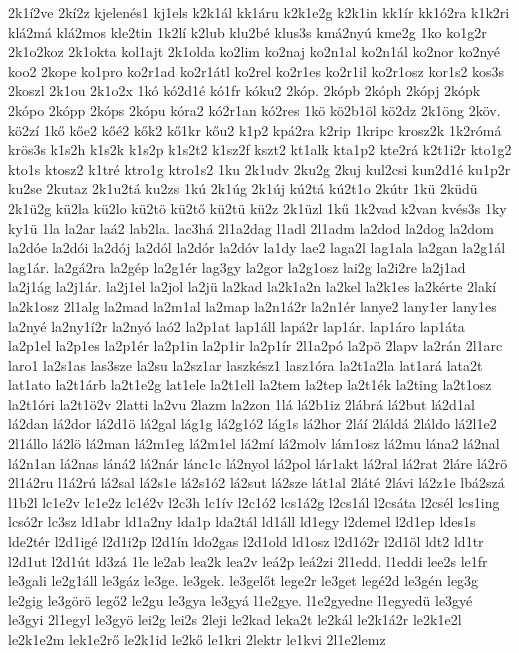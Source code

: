 {2k1í2ve
2kí2z
kjelenés1
kj1els
k2k1ál
kk1áru
k2k1e2g
k2k1in
kk1ír
kk1ó2ra
k1k2ri
klá2má
klá2mos
kle2tin
1k2lí
k2lub
klu2bé
klus3s
kmá2nyú
kme2g
1ko
ko1g2r
2k1o2koz
2k1okta
kol1ajt
2k1olda
ko2lim
ko2naj
ko2n1al
ko2n1ál
ko2nor
ko2nyé
koo2
2kope
ko1pro
ko2r1ad
ko2r1átl
ko2rel
ko2r1es
ko2r1il
ko2r1osz
kor1s2
kos3s
2koszl
2k1ou
2k1o2x
1kó
kó2d1é
kó1fr
kóku2
2kóp.
2kópb
2kóph
2kópj
2kópk
2kópo
2kópp
2kóps
2kópu
kóra2
kó2r1an
kó2res
1kö
kö2b1öl
kö2dz
2k1öng
2köv.
kö2zí
1kő
kőe2
kőé2
kők2
kő1kr
kőu2
k1p2
kpá2ra
k2rip
1kripc
krosz2k
1k2rómá
krös3s
k1s2h
k1s2k
k1s2p
k1s2t2
k1sz2f
kszt2
kt1alk
kta1p2
kte2rá
k2t1i2r
kto1g2
kto1s
ktosz2
k1tré
ktro1g
ktro1s2
1ku
2k1udv
2ku2g
2kuj
kul2csi
kun2d1é
ku1p2r
ku2se
2kutaz
2k1u2tá
ku2zs
1kú
2k1úg
2k1új
kú2tá
kú2t1o
2kútr
1kü
2küdü
2k1ü2g
kü2la
kü2lo
kü2tö
kü2tő
kü2tü
kü2z
2k1üzl
1kű
1k2vad
k2van
kvés3s
1ky
ky1ü
1la
la2ar
laá2
lab2la.
lac3há
2l1a2dag
l1adl
2l1adm
la2dod
la2dog
la2dom
la2dóe
la2dói
la2dój
la2dól
la2dór
la2dóv
la1dy
lae2
laga2l
lag1ala
la2gan
la2g1ál
lag1ár.
la2gá2ra
la2gép
la2g1ér
lag3gy
la2gor
la2g1osz
lai2g
la2i2re
la2j1ad
la2j1ág
la2j1ár.
la2j1el
la2jol
la2jü
la2kad
la2k1a2n
la2kel
la2k1es
la2kérte
2lakí
la2k1osz
2l1alg
la2mad
la2m1al
la2map
la2n1á2r
la2n1ér
lanye2
lany1er
lany1es
la2nyé
la2ny1í2r
la2nyó
laó2
la2p1at
lap1áll
lapá2r
lap1ár.
lap1áro
lap1áta
la2p1el
la2p1es
la2p1ér
la2p1in
la2p1ir
la2p1ír
2l1a2pó
la2pö
2lapv
la2rán
2l1arc
laro1
la2s1as
las3sze
la2su
la2sz1ar
laszkész1
lasz1óra
la2t1a2la
lat1ará
lata2t
lat1ato
la2t1árb
la2t1e2g
lat1ele
la2t1ell
la2tem
la2tep
la2t1ék
la2ting
la2t1osz
la2t1óri
la2t1ö2v
2latti
la2vu
2lazm
la2zon
1lá
lá2b1iz
2lábrá
lá2but
lá2d1al
lá2dan
lá2dor
lá2d1ö
lá2gal
lág1g
lá2g1ó2
lág1s
lá2hor
2láí
2láldá
2láldo
lá2l1e2
2l1állo
lá2lö
lá2man
lá2m1eg
lá2m1el
lá2mí
lá2molv
lám1osz
lá2mu
lána2
lá2nal
lá2n1an
lá2nas
láná2
lá2nár
lánc1c
lá2nyol
lá2pol
lár1akt
lá2ral
lá2rat
2láre
lá2rö
2l1á2ru
l1á2rú
lá2sal
lá2s1e
lá2s1ó2
lá2sut
lá2sze
lát1al
2láté
2lávi
lá2z1e
lbá2szá
l1b2l
lc1e2v
lc1e2z
lc1é2v
l2c3h
lc1ív
l2c1ó2
lcs1á2g
l2cs1ál
l2csáta
l2csél
lcs1ing
lcsó2r
lc3sz
ld1abr
ld1a2ny
lda1p
lda2tál
ld1áll
ld1egy
l2demel
l2d1ep
ldes1s
lde2tér
l2d1igé
l2d1i2p
l2d1ín
ldo2gas
l2d1old
ld1osz
l2d1ó2r
l2d1öl
ldt2
ld1tr
l2d1ut
l2d1út
ld3zá
1le
le2ab
lea2k
lea2v
leá2p
leá2zi
2l1edd.
l1eddi
lee2s
le1fr
le3gali
le2g1áll
le3gáz
le3ge.
le3gek.
le3gelőt
lege2r
le3get
legé2d
le3gén
leg3g
le2gig
le3görö
legő2
le2gu
le3gya
le3gyá
l1e2gye.
l1e2gyedne
l1egyedü
le3gyé
le3gyi
2l1egyl
le3gyö
lei2g
lei2s
2leji
le2kad
leka2t
le2kál
le2k1á2r
le2k1e2l
le2k1e2m
lek1e2rő
le2k1id
le2kő
le1kri
2lektr
le1kvi
2l1e2lemz
}
